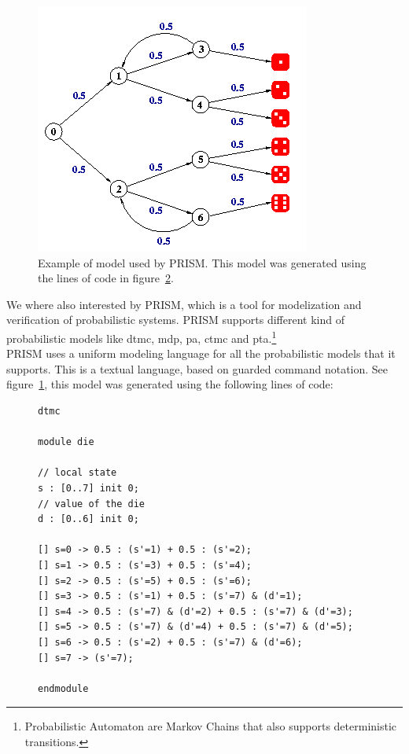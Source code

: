 \documentclass[12pt]{article}
\theoremstyle{definition}
\theoremstyle{definition}
\theoremstyle{remark}
\begin{document}
\begin{figure}
    \centering
    \includegraphics[scale=0.6]{PRISM_model.png}
    \caption{Example of model used by PRISM. This model was generated using the lines of code in figure~\ref{PRISM_code}.}
    \label{PRISM_model}
\end{figure}

We where also interested by PRISM, which is a tool for modelization and verification of probabilistic systems. PRISM supports different kind of probabilistic models like \gls{dtmc}, \gls{mdp}, \gls{pa}, \gls{ctmc} and \gls{pta}.\footnote{Probabilistic Automaton are Markov Chains that also supports deterministic transitions.}~\cite{Kwiatkowska2011}~\cite{Hinton2006}\\

PRISM uses a uniform modeling language for all the probabilistic models that it supports. This is a textual language, based on guarded command notation. See figure~\ref{PRISM_model}, this model was generated using the following lines of code:

\lstset{
  showspaces=false,
  showstringspaces=false,
  showtabs=false
}

\begin{figure}
\label{PRISM_code}
\begin{lstlisting}[caption="Dice model in PRISM",label={lst:PRISM_code}]
dtmc

module die

// local state
s : [0..7] init 0;
// value of the die
d : [0..6] init 0;

[] s=0 -> 0.5 : (s'=1) + 0.5 : (s'=2);
[] s=1 -> 0.5 : (s'=3) + 0.5 : (s'=4);
[] s=2 -> 0.5 : (s'=5) + 0.5 : (s'=6);
[] s=3 -> 0.5 : (s'=1) + 0.5 : (s'=7) & (d'=1);
[] s=4 -> 0.5 : (s'=7) & (d'=2) + 0.5 : (s'=7) & (d'=3);
[] s=5 -> 0.5 : (s'=7) & (d'=4) + 0.5 : (s'=7) & (d'=5);
[] s=6 -> 0.5 : (s'=2) + 0.5 : (s'=7) & (d'=6);
[] s=7 -> (s'=7);

endmodule
\end{lstlisting}
\end{figure}
\end{document}
